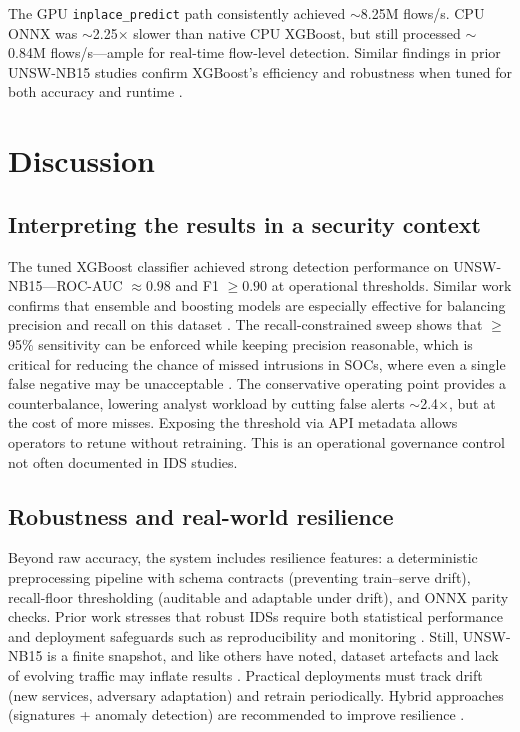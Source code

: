 \documentclass{article}
\begin{document}
The GPU \texttt{inplace\_predict} path consistently achieved $\sim$8.25M flows/s. CPU ONNX was $\sim$2.25$\times$ slower than native CPU XGBoost, but still processed $\sim$0.84M flows/s—ample for real-time flow-level detection. Similar findings in prior UNSW-NB15 studies confirm XGBoost’s efficiency and robustness when tuned for both accuracy and runtime \cite{zoghi2022, pansari2024}.

\section{Discussion}
\subsection{Interpreting the results in a security context}
The tuned XGBoost classifier achieved strong detection performance on UNSW-NB15—ROC-AUC $\approx 0.98$ and F1 $\ge 0.90$ at operational thresholds. Similar work confirms that ensemble and boosting models are especially effective for balancing precision and recall on this dataset \cite{more2024, kocher2021}. The recall-constrained sweep shows that $\ge$95\% sensitivity can be enforced while keeping precision reasonable, which is critical for reducing the chance of missed intrusions in SOCs, where even a single false negative may be unacceptable \cite{krishna2024}. The conservative operating point provides a counterbalance, lowering analyst workload by cutting false alerts $\sim$2.4$\times$, but at the cost of more misses. Exposing the threshold via API metadata allows operators to retune without retraining. This is an operational governance control not often documented in IDS studies.

\subsection{Robustness and real-world resilience}
Beyond raw accuracy, the system includes resilience features: a deterministic preprocessing pipeline with schema contracts (preventing train–serve drift), recall-floor thresholding (auditable and adaptable under drift), and ONNX parity checks. Prior work stresses that robust IDSs require both statistical performance and deployment safeguards such as reproducibility and monitoring \cite{alani2021}. Still, UNSW-NB15 is a finite snapshot, and like others have noted, dataset artefacts and lack of evolving traffic may inflate results \cite{meftah2019}. Practical deployments must track drift (new services, adversary adaptation) and retrain periodically. Hybrid approaches (signatures + anomaly detection) are recommended to improve resilience \cite{sai2024}.
\end{document}
